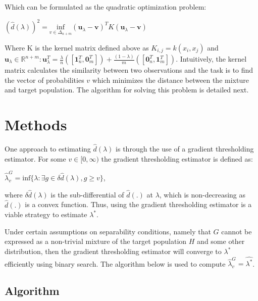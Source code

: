 \documentclass[lineno]{biometrika}
\begin{document}
Which can be formulated as the quadratic optimization problem:

\begin{center}
$(\hat{d}(\lambda))^2 = \underset{v\in \Delta_{n+m}}{\textrm{inf}} (\mathbf{u}_{\lambda} - \mathbf{v})^T K(\mathbf{u}_{\lambda} - \mathbf{v})$
\end{center}

Where K is the kernel matrix defined above as $K_{i,j} = k(x_i,x_j)$ and $\mathbf{u}_{\lambda} \in \mathbb{R}^{n+m} : \mathbf{u}_{\lambda}^T = \frac{\lambda}{n}([\mathbf{1}_n^T,\mathbf{0}_m^T]) + \frac{(1-\lambda)}{m}([\mathbf{0}_n^T,\mathbf{1}_m^T])$. Intuitively, the kernel matrix calculates the similarity between two observations and the task is to find the vector of probabilities $v$ which minimizes the distance between the mixture and target population. The algorithm for solving this problem is detailed next.

\section{Methods}

One approach to estimating $\hat{d}(\lambda)$ is through the use of a gradient thresholding estimator. For some $v \in [0,\infty)$ the gradient thresholding estimator is defined as:

\begin{center}
$\hat{\lambda}^G_v = \textrm{inf}\{\lambda : \exists g \in \delta \hat{d}(\lambda), g\ge v\}$,
\end{center}

where $\delta \hat{d}(\lambda)$ is the sub-differential of $\hat{d}(.)$ at $\lambda$, which is non-decreasing as $\hat{d}(.)$  is a convex function. Thus, using the gradient thresholding estimator is a viable strategy to estimate $\lambda^*$.

Under certain assumptions on separability conditions, namely that $G$ cannot be expressed as a non-trivial mixture of the target population $H$ and some other distribution, then the gradient thresholding estimator will converge to $\lambda^*$ efficiently using binary search. The algorithm below is used to compute $\hat{\lambda}^G_v = \hat{\lambda^*}$.

\subsection{Algorithm}
\end{document}
